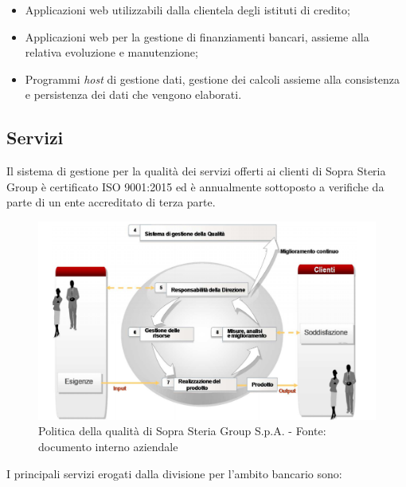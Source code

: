 	\begin{itemize}
		\item Applicazioni web utilizzabili dalla clientela degli istituti di credito;
		\item Applicazioni web per la gestione di finanziamenti bancari, assieme alla relativa evoluzione e manutenzione;
		\item Programmi \textit{host} di gestione dati, gestione dei calcoli assieme alla consistenza e persistenza dei dati che vengono elaborati.
	\end{itemize}
	
	\subsection{Servizi}
	
	Il sistema di gestione per la qualità dei servizi offerti ai clienti di Sopra Steria Group è certificato ISO 9001:2015 ed è annualmente sottoposto a verifiche da parte di un ente accreditato di terza parte.\\

	\begin{figure}[H]
	\centering
   	\includegraphics[width=1\textwidth]{immagini/ISO9001}
   	\caption{Politica della qualità di Sopra Steria Group S.p.A. - Fonte: documento interno aziendale}
	\end{figure}
	
	
	I principali servizi erogati dalla divisione per l'ambito bancario sono:
	
